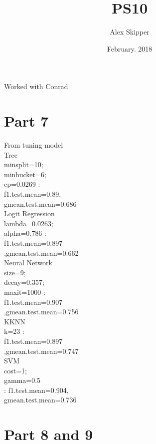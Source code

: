\documentclass{article}
\title{PS10}
\author{Alex Skipper }
\date{February. 2018}
\begin{document}
\maketitle
Worked with Conrad 
\section{Part 7}
From tuning model\\
Tree\\
minsplit=10;\\ 
minbucket=6; \\
cp=0.0269 : \\
f1.test.mean=0.89,\\
gmean.test.mean=0.686\\



Logit  Regression\\
lambda=0.0263;\\
alpha=0.786 :\\
f1.test.mean=0.897\\
,gmean.test.mean=0.662\\



Neural Network\\
size=9; \\
decay=0.357; \\
maxit=1000 :\\
f1.test.mean=0.907\\
,gmean.test.mean=0.756\\




KKNN\\
 k=23 :\\
 f1.test.mean=0.897\\
 ,gmean.test.mean=0.747\\

 
 
 
SVM\\
cost=1; \\
gamma=0.5 \\
: f1.test.mean=0.904,\\
gmean.test.mean=0.736\\



\section{Part 8 and 9}
\end{document}
